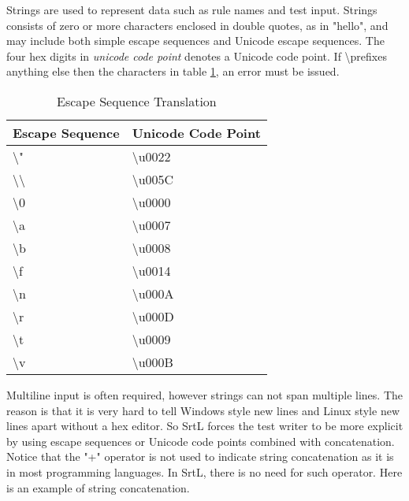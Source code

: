 

Strings are used to represent data such as rule names and test input. Strings 
consists of zero or more characters enclosed in double quotes, as in "hello", 
and may include both simple escape sequences and Unicode escape sequences.
The four hex digits in \textit{unicode code point} denotes a Unicode code point.
If \textbackslash prefixes anything else then the characters in table 
\ref{table:escape-sequence-translation}, an error must be issued.

\begin{table}[h]
    \centering
    \caption{Escape Sequence Translation}
    \label{table:escape-sequence-translation}
    \begin{tabular}{|l|l|}
        \hline
        \textbf{Escape Sequence}     & \textbf{Unicode Code Point}  \\ \hline
        \textbackslash"              & \textbackslash u0022         \\ \hline
        \textbackslash\textbackslash & \textbackslash u005C         \\ \hline
        \textbackslash 0             & \textbackslash u0000         \\ \hline
        \textbackslash a             & \textbackslash u0007         \\ \hline
        \textbackslash b             & \textbackslash u0008         \\ \hline
        \textbackslash f             & \textbackslash u0014         \\ \hline
        \textbackslash n             & \textbackslash u000A         \\ \hline
        \textbackslash r             & \textbackslash u000D         \\ \hline
        \textbackslash t             & \textbackslash u0009         \\ \hline
        \textbackslash v             & \textbackslash u000B         \\ \hline
    \end{tabular}
\end{table}

Multiline input is often required, however strings can not span multiple lines. 
The reason is that it is very hard to tell Windows style new lines and Linux 
style new lines apart without a hex editor. So SrtL forces the test writer to be
more explicit by using escape sequences or Unicode code points combined with 
concatenation. Notice that the "+" operator is not used to indicate string 
concatenation as it is in most programming languages. In SrtL, there is no need
for such operator. Here is an example of string concatenation.


